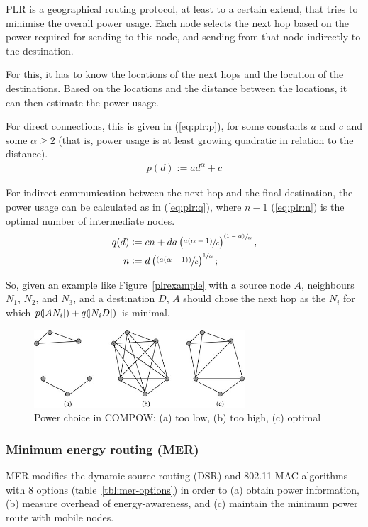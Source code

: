 PLR\cite{stojmenovic2001power} is a geographical routing protocol, at least
to a certain extend, that tries to minimise the overall power usage. Each node
selects the next hop based on the power required for sending to this node, and
sending from that node indirectly to the destination.

For this, it has to know the locations of the next hops and the location of
the destinations. Based on the locations and the distance between the locations,
it can then estimate the power usage.

For direct connections, this is given in (\ref{eq:plr:p}),
for some constants $a$ and $c$ and some $\alpha \ge 2$ (that is, power usage
is at least growing quadratic in relation to the distance).
\begin{align}\label{eq:plr:p} p(d) := ad^{\alpha} + c \end{align}

For indirect communication between the next hop and the final destination,
the power usage can be calculated as in (\ref{eq:plr:q}), where $n-1$ (\ref{eq:plr:n}) is the optimal number of intermediate nodes\cite{stojmenovic2001power}.
\begin{align}
  \label{eq:plr:q}
   q(d) &:= cn + da \left(\sfrac{a(\alpha - 1)}{c}\right)^{\sfrac{(1-\alpha)}{\alpha}}, \\
   \label{eq:plr:n}
      n &:= d\left(\sfrac{(a(\alpha - 1))}{c}\right)^{\sfrac{1}{\alpha}};
\end{align}

So, given an example like Figure~\ref{plrexample} with a source node $A$, neighbours $N_{1}$, $N_{2}$, and $N_{3}$, and a
destination $D$, $A$ should chose the next hop as the $N_{i}$ for which
$p(\abs{AN_{i}}) + q(\abs{N_{i}D})$ is minimal.

\begin{figure}
\centering
\includegraphics[width=0.7\textwidth]{images/compow-level-choice}
\caption{Power choice in COMPOW: (a) too low, (b) too high, (c) optimal}
\label{compow:power-choice}
\end{figure}

\subsubsection{Minimum energy routing (MER)}
MER\cite{doshi2002demand} modifies the dynamic-source-routing (DSR)\cite{johnson1996dynamic}
and 802.11 MAC algorithms\cite{woesner1998power} with 8 options (table~\ref{tbl:mer-options}) in order to
(a) obtain power information, (b) measure overhead of energy-awareness, and
(c) maintain the minimum power route with mobile nodes.

